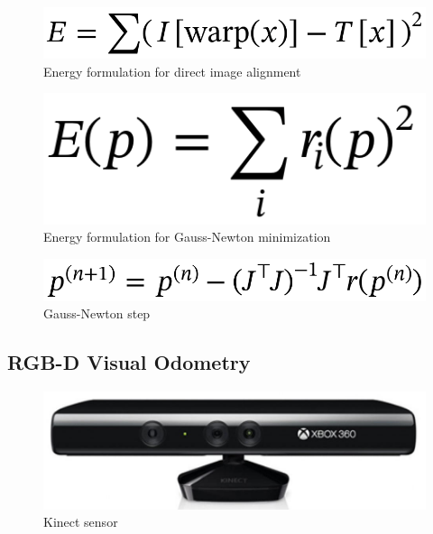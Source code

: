 \begin{figure}[ht]
	\centering
	\includegraphics[width=\linewidth]{assets/img/energy-warp.png}
	\caption{Energy formulation for direct image alignment}%
	\label{fig:energy-warp}
\end{figure}

\begin{figure}[ht]
	\centering
	\includegraphics[width=\linewidth]{assets/img/energy-gauss-newton.png}
	\caption{Energy formulation for Gauss-Newton minimization}%
	\label{fig:energy-gauss-newton}
\end{figure}

\begin{figure}[ht]
	\centering
	\includegraphics[width=\linewidth]{assets/img/gauss-newton-step.png}
	\caption{Gauss-Newton step}%
	\label{fig:gauss-newton-step}
\end{figure}

\subsection{RGB-D Visual Odometry}%
\label{sub:rgbd-visual-odometry}

\begin{figure}[ht]
	\centering
	\includegraphics[width=\linewidth]{assets/img/kinect.jpg}
	\caption{Kinect sensor}%
	\label{fig:kinect}
\end{figure}

